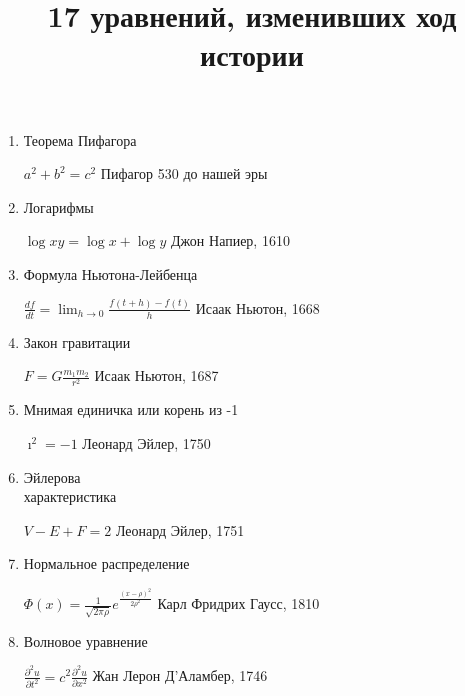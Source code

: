 \documentclass[12pt]{article}
\date{}
\title{\bf 17 уравнений, изменивших ход истории}
\begin{document}
 

\maketitle
\begin{enumerate}
 \item Теорема Пифагора \hfill \begin{minipage}[t]{100mm} $a^{2}+b^{2} = c^{2}$ \hfill Пифагор 530 до нашей эры \end{minipage}
 \item Логарифмы  \hfill \begin{minipage}[t]{100mm} $\log xy = \log x+\log y$ \hfill Джон Напиер, 1610 \end{minipage} 
 \item Формула Ньютона-Лейбенца \hfill \begin{minipage}[t]{100mm} $\frac{df}{dt} = \lim_{h \to 0}\frac {f(t+h)-f(t)}{h} $ \hfill Исаак Ньютон, 1668 \end{minipage}
 \item   Закон гравитации \hfill \begin{minipage}[t]{100mm} $F = G \frac{m_{1}m_{2}}{r^{2}}$ \hfill Исаак Ньютон, 1687 \end{minipage}
 \item \noindent
  \begin{minipage}[t]{45mm} Мнимая единичка или корень из -1 \end{minipage} \hfill \begin{minipage}[t]{100mm}  $\imath^{2} = -1$ \hfill Леонард Эйлер, 1750 \end{minipage}
 \item \noindent
  \begin{minipage}[t]{45mm} Эйлерова \\характеристика\\ \end{minipage} \hfill  \begin{minipage}[t]{100mm}  $V - E + F = 2$ \hfill Леонард Эйлер, 1751 \end{minipage}
 \item Нормальное распределение \hfill \begin{minipage}[t]{100mm} $\Phi(x) = \frac{1}{\sqrt{2\pi\rho}}e^{\frac{(x-\rho)^2}{2\rho^2}}$ \hfill Карл Фридрих Гаусс, 1810 \end{minipage}
 \item Волновое уравнение \hfill \begin{minipage}[t]{100mm} $\frac{\partial^{2} u}{\partial t^{2}} = c^{2} \frac{\partial^{2} u}{\partial x^{2}}$ \hfill Жан Лерон Д'Аламбер, 1746 \end{minipage}

\end{enumerate}
\end{document}
